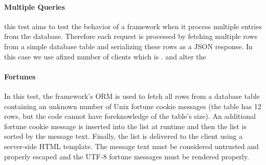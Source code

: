 \paragraph{Multiple Queries}
this test aims to test the behavior of a framework when it process multiple entries from the database.
Therefore each request is processed by fetching multiple rows from a simple database table and serializing these rows as a JSON response.
In this case we use afixed  number of clients which is .
and alter the
\paragraph{Fortunes}
In this test, the framework's ORM is used to fetch all rows from a database table containing an unknown number of Unix fortune cookie messages (the table has 12 rows, but the code cannot have foreknowledge of the table's size). An additional fortune cookie message is inserted into the list at runtime and then the list is sorted by the message text. Finally, the list is delivered to the client using a server-side HTML template. The message text must be considered untrusted and properly escaped and the UTF-8 fortune messages must be rendered properly.

